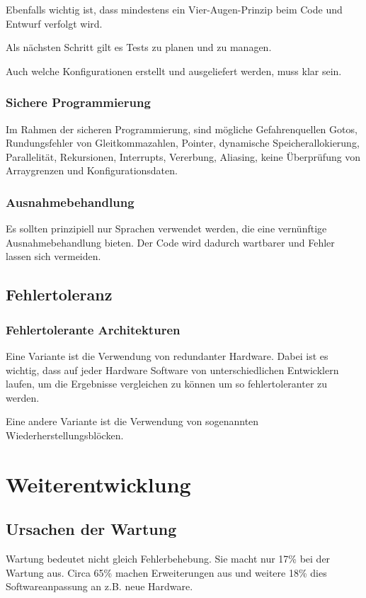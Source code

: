 Ebenfalls wichtig ist, dass mindestens ein Vier-Augen-Prinzip beim Code und Entwurf verfolgt wird. 

Als nächsten Schritt gilt es Tests zu planen und zu managen.

Auch welche Konfigurationen erstellt und ausgeliefert werden, muss klar sein.

\subsubsection{Sichere Programmierung}
Im Rahmen der sicheren Programmierung, sind mögliche Gefahrenquellen Gotos, Rundungsfehler von Gleitkommazahlen, Pointer, dynamische Speicherallokierung, Parallelität, Rekursionen, Interrupts, Vererbung, Aliasing, keine Überprüfung von Arraygrenzen und Konfigurationsdaten. 

\subsubsection{Ausnahmebehandlung}
Es sollten prinzipiell nur Sprachen verwendet werden, die eine vernünftige Ausnahmebehandlung bieten. Der Code wird dadurch wartbarer und Fehler lassen sich vermeiden.

\subsection{Fehlertoleranz}


\subsubsection{Fehlertolerante Architekturen}
Eine Variante ist die Verwendung von redundanter Hardware. Dabei ist es wichtig, dass auf jeder Hardware Software von unterschiedlichen Entwicklern laufen, um die Ergebnisse vergleichen zu können um so fehlertoleranter zu werden.

Eine andere Variante ist die Verwendung von sogenannten Wiederherstellungsblöcken.

\section{Weiterentwicklung}
\subsection{Ursachen der Wartung}
Wartung bedeutet nicht gleich Fehlerbehebung. Sie macht nur 17\% bei der Wartung aus. Circa 65\% machen Erweiterungen aus und weitere 18\% dies Softwareanpassung an z.B. neue Hardware.

